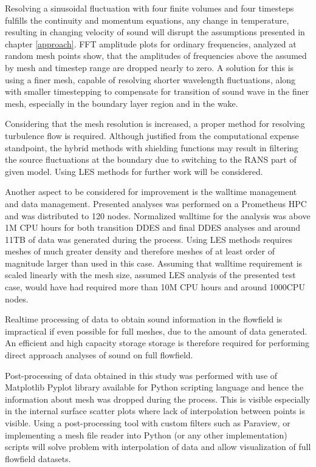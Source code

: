 Resolving a sinusoidal fluctuation with four finite volumes and four timesteps fulfills the continuity and momentum equations, any change in temperature, resulting in changing velocity of sound will disrupt the assumptions presented in chapter \ref{approach}. FFT amplitude plots for ordinary frequencies, analyzed at random mesh points show, that the amplitudes of frequencies above the assumed by mesh and timestep range are dropped nearly to zero. A solution for this is using a finer mesh, capable of resolving shorter wavelength fluctuations, along with smaller timestepping to compensate for transition of sound wave in the finer mesh, especially in the boundary layer region and in the wake.

Considering that the mesh resolution is increased, a proper method for resolving turbulence flow is required. Although justified from the computational expense standpoint, the hybrid methods with shielding functions may result in filtering the source fluctuations at the boundary due to switching to the RANS part of given model. Using LES methods for further work will be considered.

Another aspect to be considered for improvement is the walltime management and data management. Presented analyses was performed on a Prometheus HPC and was distributed to 120 nodes. Normalized walltime for the analysis was above 1M CPU hours for both transition DDES and final DDES analyses and around 11TB of data was generated during the process. Using LES methods requires meshes of much greater density and therefore meshes of at least order of magnitude larger than used in this case. Assuming that walltime requirement is scaled linearly with the mesh size, assumed LES analysis of the presented test case, would have had required more than 10M CPU hours and around 1000CPU nodes.

Realtime processing of data to obtain sound information in the flowfield is impractical if even possible for full meshes, due to the amount of data generated. An efficient and high capacity storage storage is therefore required for performing direct approach analyses of sound on full flowfield.

Post-processing of data obtained in this study was performed with use of Matplotlib Pyplot library available for Python scripting language and hence the information about mesh was dropped during the process. This is visible especially in the internal surface scatter plots where lack of interpolation between points is visible. Using a post-processing tool with custom filters such as Paraview, or implementing a mesh file reader into Python (or any other implementation) scripts will solve problem with interpolation of data and allow visualization of full flowfield datasets.

